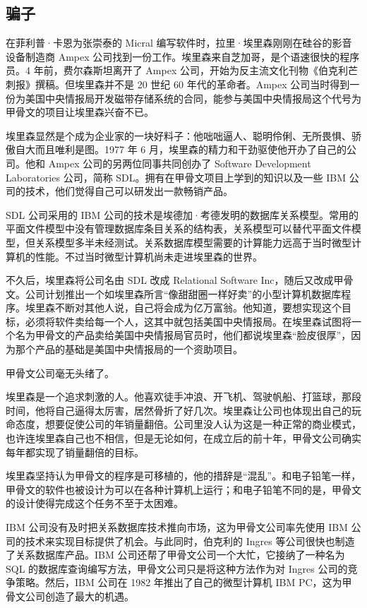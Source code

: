 \documentclass[12pt,UTF8]{ctexbook}
\begin{document}
\subsection{骗子}


在菲利普·卡恩为张崇泰的 Micral 编写软件时，拉里·埃里森刚刚在硅谷的影音设备制造商 Ampex 公司找到一份工作。埃里森来自芝加哥，是个语速很快的程序员。4 年前，费尔森斯坦离开了 Ampex 公司，开始为反主流文化刊物《伯克利芒刺报》撰稿。但埃里森并不是 20 世纪 60 年代的革命者。Ampex 公司当时得到一份为美国中央情报局开发磁带存储系统的合同，能参与美国中央情报局这个代号为甲骨文的项目让埃里森兴奋不已。

埃里森显然是个成为企业家的一块好料子：他咄咄逼人、聪明伶俐、无所畏惧、骄傲自大而且唯利是图。1977 年 6 月，埃里森的精力和干劲驱使他开办了自己的公司。他和 Ampex 公司的另两位同事共同创办了 Software Development Laboratories 公司，简称 SDL。拥有在甲骨文项目上学到的知识以及一些 IBM 公司的技术，他们觉得自己可以研发出一款畅销产品。

SDL 公司采用的 IBM 公司的技术是埃德加·考德发明的数据库关系模型。常用的平面文件模型中没有管理数据库条目关系的结构表，关系模型可以替代平面文件模型，但关系模型多半未经测试。关系数据库模型需要的计算能力远高于当时微型计算机的性能。不过当时微型计算机尚未走进埃里森的世界。

不久后，埃里森将公司名由 SDL 改成 Relational Software Inc，随后又改成甲骨文。公司计划推出一个如埃里森所言“像甜甜圈一样好卖”的小型计算机数据库程序。埃里森不断对其他人说，自己将会成为亿万富翁。他知道，要想实现这个目标，必须将软件卖给每一个人，这其中就包括美国中央情报局。在埃里森试图将一个名为甲骨文的产品卖给美国中央情报局官员时，他们都说埃里森“脸皮很厚”，因为那个产品的基础是美国中央情报局的一个资助项目。

甲骨文公司毫无头绪了。

埃里森是一个追求刺激的人。他喜欢徒手冲浪、开飞机、驾驶帆船、打篮球，那段时间，他将自己逼得太厉害，居然骨折了好几次。埃里森让公司也体现出自己的玩命态度，想要促使公司的年销量翻倍。公司里没人认为这是一种正常的商业模式，也许连埃里森自己也不相信，但是无论如何，在成立后的前十年，甲骨文公司确实每年都实现了销量翻倍的目标。

埃里森坚持认为甲骨文的程序是可移植的，他的措辞是“混乱”。和电子铅笔一样，甲骨文的软件也被设计为可以在各种计算机上运行；和电子铅笔不同的是，甲骨文的设计使得完成这个任务不至于太困难。

IBM 公司没有及时把关系数据库技术推向市场，这为甲骨文公司率先使用 IBM 公司的技术来实现目标提供了机会。与此同时，伯克利的 Ingres 等公司很快也制造了关系数据库产品。IBM 公司还帮了甲骨文公司一个大忙，它接纳了一种名为 SQL 的数据库查询编写方法，甲骨文公司只是将这种方法作为对 Ingres 公司的竞争策略。然后，IBM 公司在 1982 年推出了自己的微型计算机 IBM PC，这为甲骨文公司创造了最大的机遇。
\end{document}
